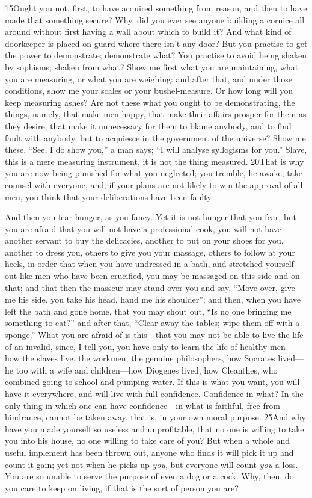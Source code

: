 15Ought you not, first, to have acquired something from reason, and then to have made that something secure? Why, did you ever see anyone building a cornice all around without first having a wall about which to build it? And what kind of doorkeeper is placed on guard where there isn't any door? But you practise to get the power to demonstrate; demonstrate what? You practise to avoid being shaken by sophisms; shaken from what? Show me first what you are maintaining, what you are measuring, or what you are weighing: and after that, and under those conditions, show me your scales or your bushel-measure. Or how long will you keep measuring ashes? Are not these what you ought to be demonstrating, the things, namely, that make men happy, that make their affairs prosper for them as they desire, that make it unnecessary for them to blame anybody, and to find fault with anybody, but to acquiesce in the government of the universe? Show me these. ``See, I do show you,'' a man says; ``I will analyse syllogisms for you.'' Slave, this is a mere measuring instrument, it is not the thing measured. 20That is why you are now being punished for what you neglected; you tremble, lie awake, take counsel with everyone, and, if your plans are not likely to win the approval of all men, you think that your deliberations have been faulty.

And then you fear hunger, as you fancy. Yet it is not hunger that you fear, but you are afraid that you will not have a professional cook, you will not have another servant to buy the delicacies, another to put on your shoes for you, another to dress you, others to give you your massage, others to follow at your heels, in order that when you have undressed in a bath, and stretched yourself out like men who have been crucified, you may be massaged on this side and on that; and that then the masseur may stand over you and say, ``Move over, give me his side, you take his head, hand me his shoulder''; and then, when you have left the bath and gone home, that you may shout out, ``Is no one bringing me something to eat?'' and after that, ``Clear away the tables; wipe them off with a sponge.'' What you are afraid of is this—that you may not be able to live the life of an invalid, since, I tell you, you have only to learn the life of healthy men—how the slaves live, the workmen, the genuine philosophers, how Socrates lived—he too with a wife and children—how Diogenes lived, how Cleanthes, who combined going to school and pumping water. If this is what you want, you will have it everywhere, and will live with full confidence. Confidence in what? In the only thing in which one can have confidence—in what is faithful, free from hindrance, cannot be taken away, that is, in your own moral purpose. 25And why have you made yourself so useless and unprofitable, that no one is willing to take you into his house, no one willing to take care of you? But when a whole and useful implement has been thrown out, anyone who finds it will pick it up and count it gain; yet not when he picks up \emph{you}, but everyone will count \emph{you} a loss. You are so unable to serve the purpose of even a dog or a cock. Why, then, do you care to keep on living, if that is the sort of person you are?


